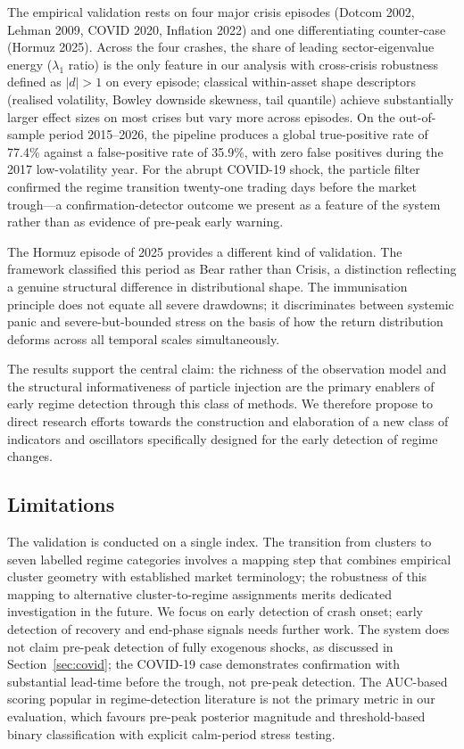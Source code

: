 \documentclass[11pt]{article}
\begin{document}
The empirical validation rests on four major crisis episodes (Dotcom
2002, Lehman 2009, COVID 2020, Inflation 2022) and one differentiating
counter-case (Hormuz 2025). Across the four crashes, the share of
leading sector-eigenvalue energy ($\lambda_1$ ratio) is the only feature
in our analysis with cross-crisis robustness defined as $|d| > 1$ on
every episode; classical within-asset shape descriptors (realised
volatility, Bowley downside skewness, tail quantile) achieve
substantially larger effect sizes on most crises but vary more across
episodes. On the out-of-sample period 2015--2026, the pipeline produces
a global true-positive rate of 77.4\% against a false-positive rate of
35.9\%, with zero false positives during the 2017 low-volatility year.
For the abrupt COVID-19 shock, the particle filter confirmed the regime
transition twenty-one trading days before the market trough---a
confirmation-detector outcome we present as a feature of the system
rather than as evidence of pre-peak early warning.

The Hormuz episode of 2025 provides a different kind of validation. The
framework classified this period as Bear rather than Crisis, a
distinction reflecting a genuine structural difference in distributional
shape. The immunisation principle does not equate all severe drawdowns;
it discriminates between systemic panic and severe-but-bounded stress on
the basis of how the return distribution deforms across all temporal
scales simultaneously.

The results support the central claim: the richness of the observation
model and the structural informativeness of particle injection are the
primary enablers of early regime detection through this class of
methods. We therefore propose to direct research efforts towards the
construction and elaboration of a new class of indicators and
oscillators specifically designed for the early detection of regime
changes.

\subsection{Limitations}

The validation is conducted on a single index. The transition from
clusters to seven labelled regime categories involves a mapping step
that combines empirical cluster geometry with established market
terminology; the robustness of this mapping to alternative
cluster-to-regime assignments merits dedicated investigation in the
future. We focus on early detection of crash onset; early detection of
recovery and end-phase signals needs further work. The system does not
claim pre-peak detection of fully exogenous shocks, as discussed in
Section~\ref{sec:covid}; the COVID-19 case demonstrates confirmation
with substantial lead-time before the trough, not pre-peak detection.
The AUC-based scoring popular in regime-detection literature is not the
primary metric in our evaluation, which favours pre-peak posterior
magnitude and threshold-based binary classification with explicit
calm-period stress testing.
\end{document}
